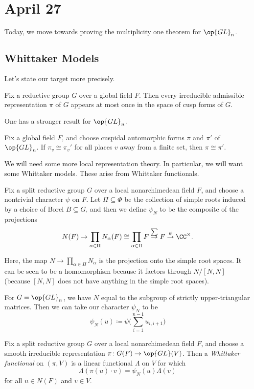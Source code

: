 \documentclass[../notes.tex]{subfiles}
\begin{document}
\section{April 27}
Today, we move towards proving the multiplicity one theorem for $\op{GL}_n$.

\subsection{Whittaker Models}
Let's state our target more precisely.
\begin{theorem}
	Fix a reductive group $G$ over a global field $F$. Then every irreducible admissible representation $\pi$ of $G$ appears at most once in the space of cusp forms of $G$.
\end{theorem}
One has a stronger result for $\op{GL}_n$.
\begin{theorem}
	Fix a global field $F$, and choose cuspidal automorphic forms $\pi$ and $\pi'$ of $\op{GL}_n$. If $\pi_v\cong\pi_v'$ for all places $v$ away from a finite set, then $\pi\cong\pi'$.
\end{theorem}
We will need some more local representation theory. In particular, we will want some Whittaker models. These arise from Whittaker functionals.
\begin{notation}
	Fix a split reductive group $G$ over a local nonarchimedean field $F$, and choose a nontrivial character $\psi$ on $F$. Let $\Pi\subseteq\Phi$ be the collection of simple roots induced by a choice of Borel $B\subseteq G$, and then we define $\psi_N$ to be the composite of the projections
	\[N(F)\to\prod_{\alpha\in\Pi}N_\alpha(F)\cong\prod_{\alpha\in\Pi}F\stackrel\sum\to F\stackrel\psi\to\CC^\times.\]
\end{notation}
\begin{remark}
	Here, the map $N\to\prod_{\alpha\in\Pi}N_\alpha$ is the projection onto the simple root spaces. It can be seen to be a homomorphism because it factors through $N/[N,N]$ (because $[N,N]$ does not have anything in the simple root spaces).
\end{remark}
\begin{example}
	For $G=\op{GL}_n$, we have $N$ equal to the subgroup of strictly upper-triangular matrices. Then we can take our character $\psi_N$ to be
	\[\psi_N(u)\coloneqq\psi\Bigg(\sum_{i=1}^{n-1}u_{i,i+1}\Bigg)\]
\end{example}
\begin{definition}
	Fix a split reductive group $G$ over a local nonarchimedean field $F$, and choose a smooth irreducible representation $\pi\colon G(F)\to\op{GL}(V)$. Then a \textit{Whittaker functional} on $(\pi,V)$ is a linear functional $\Lambda$ on $V$ for which
	\[\Lambda(\pi(u)\cdot v)=\psi_N(u)\Lambda(v)\]
	for all $u\in N(F)$ and $v\in V$.
\end{definition}
\end{document}
